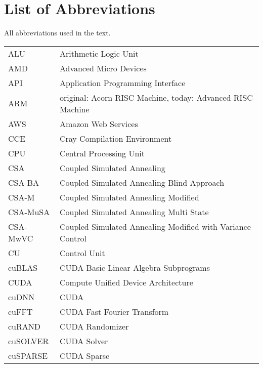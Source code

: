 \chapter*{List of Abbreviations}
All abbreviations used in the text.
\begin{longtable}{ll}
	ALU       & Arithmetic Logic Unit                                      \\
	AMD       & Advanced Micro Devices                                     \\
	API       & Application Programming Interface                          \\
	ARM       & original: Acorn RISC Machine, today: Advanced RISC Machine \\
	AWS		  & Amazon Web Services										   \\
	CCE       & Cray Compilation Environment                               \\
	CPU       & Central Processing Unit                                    \\
	CSA       & Coupled Simulated Annealing                                \\
	CSA-BA    & Coupled Simulated Annealing Blind Approach                 \\
	CSA-M     & Coupled Simulated Annealing Modified                       \\
	CSA-MuSA  & Coupled Simulated Annealing Multi State                    \\
	CSA-MwVC  & Coupled Simulated Annealing Modified with Variance Control \\
	CU        & Control Unit                                               \\
	cuBLAS    & CUDA Basic Linear Algebra Subprograms                      \\
	CUDA      & Compute Unified Device Architecture                        \\
	cuDNN     & CUDA                                                       \\
	cuFFT     & CUDA Fast Fourier Transform                                \\
	cuRAND    & CUDA Randomizer                                            \\
	cuSOLVER  & CUDA Solver                                                \\
	cuSPARSE  & CUDA Sparse                                                \\

\end{longtable}
